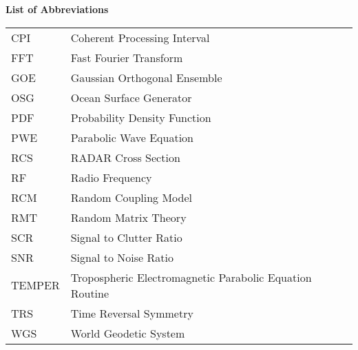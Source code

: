 \noindent\Large{\bf{List of Abbreviations}}

\vspace{24pt}

\small\normalsize

\begin{supertabular}{ll}
CPI & Coherent Processing Interval \\
FFT & Fast Fourier Transform \\
GOE & Gaussian Orthogonal Ensemble \\
OSG & Ocean Surface Generator \\
PDF & Probability Density Function \\
PWE & Parabolic Wave Equation \\
RCS & RADAR Cross Section \\
RF & Radio Frequency \\
RCM & Random Coupling Model \\
RMT & Random Matrix Theory \\
SCR & Signal to Clutter Ratio \\
SNR & Signal to Noise Ratio\\
TEMPER & Tropospheric Electromagnetic Parabolic Equation Routine \\
TRS & Time Reversal Symmetry \\
WGS & World Geodetic System \\
\end{supertabular}
